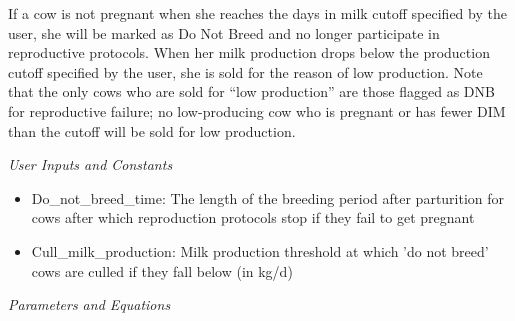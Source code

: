 \begin{refsection}
\begin{enumerate}
        If a cow is not pregnant when she reaches the days in milk cutoff specified by the user, she will be marked as Do Not Breed and no longer participate in reproductive protocols. When her milk production drops below the production cutoff specified by the user, she is sold for the reason of low production. Note that the only cows who are sold for “low production” are those flagged as DNB for reproductive failure; no low-producing cow who is pregnant or has fewer DIM than the cutoff will be sold for low production. 

         \textit{User Inputs and Constants}
         \vspace{0.1cm}
         
         \begin{itemize}
             \item Do\_not\_breed\_time: The length of the breeding period after parturition for cows after which reproduction protocols stop if they fail to get pregnant
             \item Cull\_milk\_production: Milk production threshold at which 'do not breed' cows are culled if they fall below (in kg/d)
         \end{itemize}

         \textit{Parameters and Equations}
         \vspace{0.1cm}
        

\end{enumerate}
\end{refsection}
